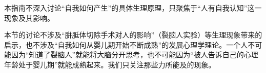 本指南不深入讨论“自我如何产生”的具体生理原理，只聚焦于“人有自我认知”这一现象及其影响。
\begin{explain}
本节的讨论不涉及“胼胝体切除手术对人的影响”（裂脑人实验）等生理现象带来的启示，也不涉及“自我如何从婴儿期开始不断成熟”的发展心理学理论。一个人不可能因为“知道了裂脑人”就能将大脑分开思考，也不可能因为“被人告诉自己的心理年龄处于婴儿期”就能成熟起来。我们只关注那些力所能及的现象。
\end{explain}


